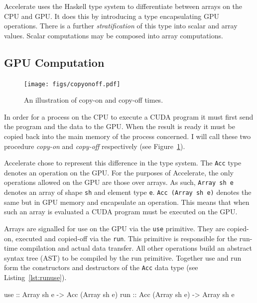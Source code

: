\documentclass[12pt,a4paper,twoside]{scrbook}
\begin{document}
Accelerate uses the Haskell type system to differentiate between arrays
on the CPU and GPU. It does this by introducing a type encapsulating GPU
operations. There is a further \emph{stratification} of this type into
scalar and array values. Scalar computations may be composed into
array computations.

\subsection{GPU Computation}

\begin{figure}
  \texttt{[image: figs/copyonoff.pdf]}
  \caption{An illustration of copy-on and copy-off times.  }
  \label{fig:copyonoff}
\end{figure}

In order for a process on the CPU to execute a CUDA program it must first send
the program and the data to the GPU. When the result is ready it must be copied
back into the main memory of the process concerned. I will call these two
procedure \emph{copy-on} and \emph{copy-off} respectively (see
Figure~\ref{fig:copyonoff}).

Accelerate chose to represent this difference in the type system. The
\texttt{Acc} type denotes an operation on the GPU. For the purposes of
Accelerate, the only operations allowed on the GPU are those over arrays. As
such, \texttt{Array sh e} denotes an array of shape \texttt{sh} and element type
\texttt{e}.  \texttt{Acc (Array sh e)} denotes the same but in GPU memory and
encapsulate an operation. This means that when such an array is evaluated a CUDA
program must be executed on the GPU.

Arrays are signalled for use on the GPU via the \texttt{use} primitive.  They
are copied-on, executed and copied-off via the \texttt{run}. This primitive is
responsible for the run-time compilation and actual data transfer. All other
operations build an abstract syntax tree (AST) to be compiled by the run
primitive. Together use and run form the constructors and destructors of the
\texttt{Acc} data type (see Listing~\ref{lst:runuse}).

\begin{hflisting}[label={lst:runuse}, caption=The basic constructors and
  destructors for moving arrays too and from the GPU in Accelerate.]
use :: Array sh e -> Acc (Array sh e)
run :: Acc (Array sh e) -> Array sh e
\end{hflisting}
\end{document}
